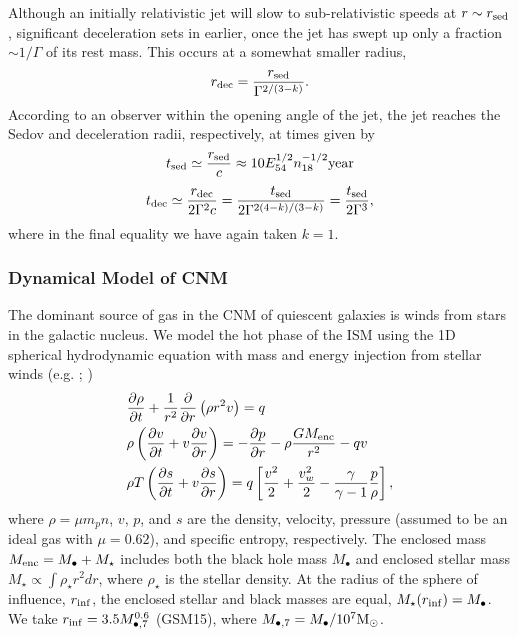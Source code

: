 \documentclass[usenatbib,fleqn]{mnras}
\newcommand{\Mbh}[1][]{M_{\bullet#1}}
\newcommand{\Menc}{M_{\rm enc}}
\newcommand{\Msun}{{\rm M_\odot}}
\begin{document}
Although an initially relativistic jet will slow to sub-relativistic
speeds at $r \sim r_{\rm sed}$, significant deceleration sets in
earlier, once the jet has swept up only a fraction $\sim 1/\Gamma$ of
its rest mass.  This occurs at a somewhat smaller radius,
\begin{equation}
  r_{\rm dec}=\frac{r_{\rm sed}}{\Gamma^{2/(3-k)}}.
  \label{eq:rdec2}
\end{equation}
According to an observer within the opening angle of the jet, the jet
reaches the Sedov and deceleration radii, respectively, at times given
by
\begin{equation}
t_{\rm sed} \simeq \frac{r_{\rm sed}}{c} \approx
10 E_{54}^{1/2}n_{18}^{-1/2} {\rm year}
 \end{equation} 
\begin{equation}
t_{\rm dec} \simeq
\frac{r_{\rm dec}}{2\Gamma^{2} c} = \frac{t_{\rm
    sed}}{2\Gamma^{2(4-k)/(3-k)}} = \frac{t_{\rm sed}}{2\Gamma^{3}},
 \label{eq:tdec}
\end{equation}
%
where in the final equality we have again taken $k = 1$.


\subsubsection{Dynamical Model of CNM}
\label{sec:model}

The dominant source of gas in the CNM of quiescent galaxies is winds
from stars in the galactic nucleus. We model the hot phase of the ISM
using the 1D spherical hydrodynamic equation with mass and energy
injection from stellar winds (e.g. \citealt{Holzer+1970};
\citealt{Quataert2004})
\begin{align}
  &\frac{\partial \rho}{\partial t}+\frac{1}{r^2}\frac{\partial}{\partial r}\left(\rho r^2 v\right)=q \label{eq:drhodt}\\
  &\rho \left(\frac{\partial v}{\partial t} + v\frac{\partial
      v}{\partial r}\right) =-\frac{\partial p}{\partial r}- \rho\frac{GM_{\rm enc}}{r^{2}} -q v \label{eq:dvdt}\\
  &\rho T\left(\frac{\partial s}{\partial t} + v\frac{\partial
      s}{\partial
      r}\right)=q\left[\frac{v^2}{2}+\frac{v_w^2}{2}-\frac{\gamma}{\gamma-1}
    \frac{p}{\rho} \right] ,
\label{eq:model}
\end{align}
where $\rho = \mu m_p n$, $v$, $p$, and $s$ are the density, velocity,
pressure (assumed to be an ideal gas with $\mu = 0.62$), and specific
entropy, respectively.  The enclosed mass $\Menc = M_{\bullet} +
M_{\star}$ includes both the black hole mass $M_{\bullet}$ and
enclosed stellar mass $M_{\star} \propto \int \rho_{\star}r^{2}dr$,
where $\rho_{\star}$ is the stellar density. At the radius of the
sphere of influence, $r_{\rm inf}$, the enclosed stellar and black
masses are equal, $M_{\star}(r_{\rm inf})=\Mbh$.  We take $r_{\rm
  inf}=3.5 \Mbh[,7]^{0.6}$ (GSM15), where $\Mbh[,7]=\Mbh/10^7 \Msun$.
\end{document}
